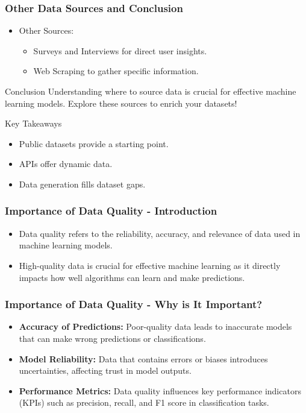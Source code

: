 \documentclass[aspectratio=169]{beamer}
\begin{document}
\begin{frame}[fragile]
    \frametitle{Other Data Sources and Conclusion}
    \begin{itemize}
        \item Other Sources:
            \begin{itemize}
                \item Surveys and Interviews for direct user insights.
                \item Web Scraping to gather specific information.
            \end{itemize}
    \end{itemize}
    
    \begin{block}{Conclusion}
        Understanding where to source data is crucial for effective machine learning models. Explore these sources to enrich your datasets!
    \end{block}

    \begin{block}{Key Takeaways}
        \begin{itemize}
            \item Public datasets provide a starting point.
            \item APIs offer dynamic data.
            \item Data generation fills dataset gaps.
        \end{itemize}
    \end{block}
\end{frame}

\begin{frame}[fragile]
    \frametitle{Importance of Data Quality - Introduction}
    \begin{itemize}
        \item Data quality refers to the reliability, accuracy, and relevance of data used in machine learning models.
        \item High-quality data is crucial for effective machine learning as it directly impacts how well algorithms can learn and make predictions.
    \end{itemize}
\end{frame}

\begin{frame}[fragile]
    \frametitle{Importance of Data Quality - Why is It Important?}
    \begin{itemize}
        \item \textbf{Accuracy of Predictions:} Poor-quality data leads to inaccurate models that can make wrong predictions or classifications.
        \item \textbf{Model Reliability:} Data that contains errors or biases introduces uncertainties, affecting trust in model outputs.
        \item \textbf{Performance Metrics:} Data quality influences key performance indicators (KPIs) such as precision, recall, and F1 score in classification tasks.
    \end{itemize}
\end{frame}
\end{document}
